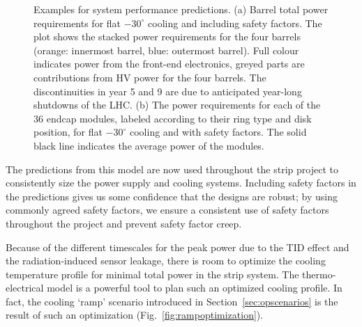 \begin{figure}[ht]
\centering
{}\quad\quad
{}
\caption{Examples for system performance predictions. (a) Barrel total power requirements for flat $-30^\circ$ cooling and including safety factors. The plot shows the stacked power requirements for the four barrels (orange: innermost barrel, blue: outermost barrel). Full colour indicates power from the front-end electronics, greyed parts are contributions from HV power for the four barrels. The discontinuities in year 5 and 9 are due to anticipated year-long shutdowns of the LHC. (b) The power requirements for each of the 36 endcap modules, labeled according to their ring type and disk position, for flat $-30^\circ$ cooling and with safety factors. The solid black line indicates the average power of the modules.}
\label{fig:systemperformance}
\end{figure}

The predictions from this model are now used throughout the strip project to consistently size the power supply and cooling systems. Including safety factors in the predictions gives us some confidence that the designs are robust; by using commonly agreed safety factors, we ensure a consistent use of safety factors throughout the project and prevent safety factor creep.

Because of the different timescales for the peak power due to the TID effect and the radiation-induced sensor leakage, there is room to optimize the cooling temperature profile for minimal total power in the strip system. The thermo-electrical model is a powerful tool to plan such an optimized cooling profile. In fact, the cooling `ramp' scenario introduced in Section~\ref{sec:opscenarios} is the result of such an optimization (Fig.~\ref{fig:rampoptimization}).

